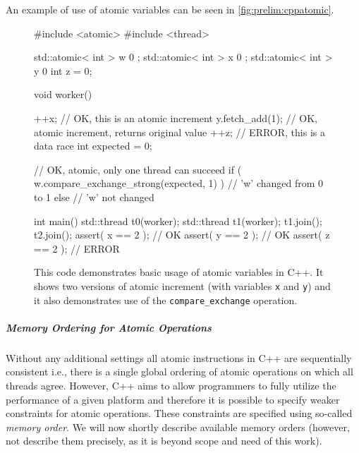 An example of use of atomic variables can be seen in
\autoref{fig:prelim:cppatomic}.

\begin{figure}[tp]
    \begin{cppcode}
        #include <atomic>
        #include <thread>

        std::atomic< int > w { 0 };
        std::atomic< int > x { 0 };
        std::atomic< int > y { 0 }
        int z = 0;

        void worker() {
            ++x; // OK, this is an atomic increment
            y.fetch_add(1); // OK, atomic increment, returns original value
            ++z; // ERROR, this is a data race
            int expected = 0;

            // OK, atomic, only one thread can succeed
            if ( w.compare_exchange_strong(expected, 1) ) {
                // 'w' changed from 0 to 1
            } else {
                // 'w' not changed
            }
        }

        int main() {
            std::thread t0(worker);
            std::thread t1(worker);
            t1.join();
            t2.join();
            assert( x == 2 ); // OK
            assert( y == 2 ); // OK
            assert( z == 2 ); // ERROR
        }
    \end{cppcode}
    \caption{This code demonstrates basic usage of atomic variables in C++.
    It shows two versions of atomic increment (with variables \texttt{x} and
    \texttt{y}) and it also demonstrates use of the \texttt{compare\_exchange}
    operation.
    }\label{fig:prelim:cppatomic}
\end{figure}

\subparagraph{Memory Ordering for Atomic Operations}

Without any additional settings all atomic instructions in C++ are sequentially
consistent i.e., there is a single global ordering of atomic operations on
which all threads agree.
However, C++ aims to allow programmers to fully utilize the performance of a
given platform and therefore it is possible to specify weaker constraints for
atomic operations.
These constraints are specified using so-called \emph{memory order}.
We will now shortly describe available memory orders (however, not describe
them precisely, as it is beyond scope and need of this work).

